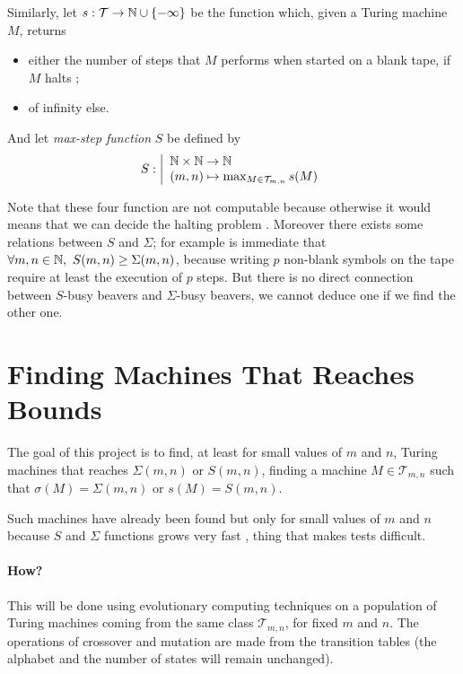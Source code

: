 \documentclass{report}
\begin{document}
Similarly, let $s : \mathcal{T} \to \mathbb{N} \cup \{-\infty\}$ be the function which, given a Turing machine $M$, returns
\begin{itemize}
\item either the number of steps that $M$ performs when started on a blank tape, if $M$ halts ;
\item of infinity else.
\end{itemize}

And let \emph{max-step function} $S$ be defined by
\[
S : \left |
\begin{array}{l}
  \mathbb{N} \times \mathbb{N} \to \mathbb{N}\\
(m,n) \mapsto \max_{M \in \mathcal{T}_{m,n}} s(M)
\end{array}
\right .
\]

Note that these four function are not computable because otherwise it would means that we can decide the halting problem \cite{rado}. Moreover there exists some relations between $S$ and $\Sigma$; for example is immediate that $\forall m,n \in \mathbb{N},\ S(m,n) \geq \Sigma(m,n)$, because writing $p$ non-blank symbols on the tape require at least the execution of $p$ steps. But there is no direct connection between $S$-busy beavers and $\Sigma$-busy beavers, \ie we cannot deduce one if we find the other one.

\section{Finding Machines That Reaches Bounds}

The goal of this project is to find, at least for small values of $m$ and $n$, Turing machines that reaches $\Sigma(m,n)$ or $S(m,n)$, \ie finding a machine $M \in \mathcal{T}_{m,n}$ such that $\sigma(M) = \Sigma(m,n)$ or $s(M) = S(m,n)$.

Such machines have already been found \cite{rado} but only for small values of $m$ and $n$ because $S$ and $\Sigma$ functions grows very fast \cite{rado}, thing that makes tests difficult.


\paragraph{How?} This will be done using evolutionary computing techniques on a population of Turing machines coming from the same class $\mathcal{T}_{m,n}$, for fixed $m$ and $n$. The operations of crossover and mutation are made from the transition tables (the alphabet and the number of states will remain unchanged).
\end{document}

